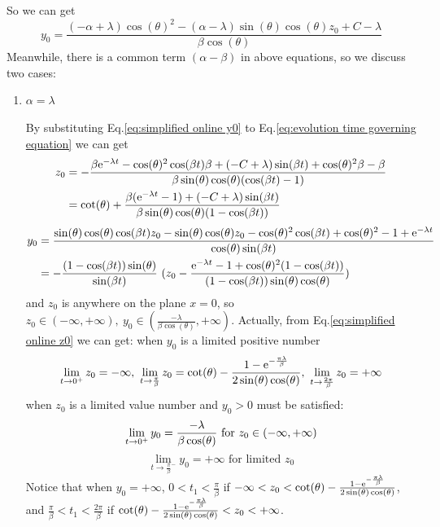 \documentclass[a4paper,10pt]{article}
\begin{document}
	So we can get 
	\begin{equation}
	{y_0}=\frac{(-\alpha+\lambda) \cos(\theta)^{2}-(\alpha-\lambda) \sin(\theta) \cos(\theta){z_0} +C-\lambda}{\beta \cos(\theta)}
	\label{eq:simplified online y0}
	\end{equation}
	Meanwhile, there is a common term $(\alpha - \beta)$ in above equations, so we discuss two cases:
	\begin{enumerate}
		\item $\alpha = \lambda$
		
		By substituting Eq.\ref{eq:simplified online y0} to Eq.\ref{eq:evolution time governing equation} we can get 
		\begin{align}
			\nonumber
			{z_0} &=-\frac{\beta {\rm e}^{-\lambda t}-\cos(\theta)^{2} \cos(\beta t) \beta+(-C+\lambda) \sin(\beta t)+\cos(\theta)^{2} \beta-\beta}{\beta \sin(\theta) \cos(\theta) (\cos(\beta t)-1)}\\
			&=\cot(\theta)+\frac{\beta ({\rm e}^{-\lambda t}-1)+(-C+\lambda) \sin(\beta t)}{\beta \sin(\theta) \cos(\theta) (1-\cos(\beta t))}
			\label{eq:simplified online z0}
		\end{align}
	\begin{align}
		\nonumber
	{y_0} &=\frac{\sin(\theta) \cos(\theta) \cos(\beta t) {z_0}-\sin(\theta) \cos(\theta) {z_0}-\cos(\theta)^{2} \cos(\beta t)+\cos(\theta)^{2}-1+{\rm e}^{-\lambda t}}{\cos(\theta) \sin(\beta t)} \\
	&=
	-\frac{(1-\cos(\beta t))\sin(\theta)}{\sin(\beta t) } ~ ({z_0}-\frac{{\rm e}^{-\lambda t}-1+\cos(\theta)^{2} (1-\cos(\beta t))}{(1-\cos(\beta t)) \sin(\theta) \cos(\theta)})
	\label{eq:retuning time controlled y0}
	\end{align}
	and $z_0$ is anywhere on the plane $x=0$, so $z_0 \in (-\infty,+\infty),~y_0 \in (\frac{-\lambda}{\beta \cos(\theta)},+\infty) $. Actually, from Eq.\ref{eq:simplified online z0} we can get:
	when $y_0$ is a limited positive number
	$$
	\lim_{t \rightarrow 0^+} z_0 = -\infty,~ \lim_{t \rightarrow \frac{ \pi}{\beta}} z_0= \cot(\theta)-\frac{1-{\rm e}^{-\frac{\pi \lambda}{\beta}}}{2 \sin(\theta) \cos(\theta)},~ \lim_{t \rightarrow \frac{2 \pi}{\beta}} z_0= +\infty
	$$
	when $z_0$ is a limited value number and $y_0>0$ must be satisfied:
	$$
	\lim_{t \rightarrow 0^+} y_0 = \frac{-\lambda}{\beta \cos(\theta)} ~ {\rm for} ~z_0 \in (-\infty,+\infty) $$ 
	$$\lim_{t \rightarrow \frac{ \pi}{\beta}^-} y_0= + \infty \text{ for limited }  z_0 $$
	Notice that when $y_0 = + \infty$, $0<t_1<\frac{\pi}{\beta}$ if $- \infty<z_0<\cot(\theta)-\frac{1-{\rm e}^{-\frac{\pi \lambda}{\beta}}}{2 \sin(\theta) \cos(\theta)}$, and $\frac{\pi}{\beta}<t_1<\frac{2\pi}{\beta}$ if $\cot(\theta)-\frac{1-{\rm e}^{-\frac{\pi \lambda}{\beta}}}{2 \sin(\theta) \cos(\theta)}<z_0<+ \infty$.
	

\end{enumerate}
\end{document}
